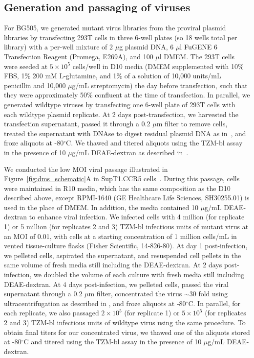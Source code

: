 \documentclass[9pt]{elife}
\begin{document}
\subsection{Generation and passaging of viruses}
For BG505, we generated mutant virus libraries from the proviral plasmid libraries by transfecting 293T cells in three 6-well plates (so 18 wells total per library) with a per-well mixture of 2 $\mu$g plasmid DNA, 6 $\mu$l FuGENE 6 Transfection Reagent (Promega, E269A), and 100 $\mu$l DMEM.
The 293T cells were seeded at $5\times 10^5$ cells/well in D10 media (DMEM supplemented with 10\% FBS, 1\% 200 mM L-glutamine, and 1\% of a solution of 10,000 units/mL penicillin and 10,000 $\mu$g/mL streptomycin) the day before transfection, such that they were approximately 50\% confluent at the time of transfection.
In parallel, we generated wildtype viruses by transfecting one 6-well plate of 293T cells with each wildtype plasmid replicate.
At 2 days post-transfection, we harvested the transfection supernatant, passed it through a 0.2 $\mu$m filter to remove cells, treated the supernatant with DNAse to digest residual plasmid DNA as in~\citet{haddox2016experimental}, and froze aliquots at -80$^{\circ}$C.
We thawed and titered aliquots using the TZM-bl assay in the presence of 10 $\mu$g/mL DEAE-dextran as described in~\citet{dingens2017comprehensive}.

We conducted the low MOI viral passage illustrated in Figure~\ref{fig:dms_schematic}A in SupT1.CCR5 cells~\citep[obtained from Dr. James Hoxie;][]{boyd2015mutations}.
During this passage, cells were maintained in R10 media, which has the same composition as the D10 described above, except RPMI-1640 (GE Healthcare Life Sciences, SH30255.01) is used in the place of DMEM.
In addition, the media contained 10 $\mu$g/mL DEAE-dextran to enhance viral infection.
We infected cells with 4 million (for replicate 1) or 5 million (for replicates 2 and 3) TZM-bl infectious units of mutant virus at an MOI of 0.01, with cells at a starting concentration of 1 million cells/mL in vented tissue-culture flasks (Fisher Scientific, 14-826-80).
At day 1 post-infection, we pelleted cells, aspirated the supernatant, and resuspended cell pellets in the same volume of fresh media still including the DEAE-dextran.
At 2 days post-infection, we doubled the volume of each culture with fresh media still including DEAE-dextran.
At 4 days post-infection, we pelleted cells, passed the viral supernatant through a 0.2 $\mu$m filter, concentrated the virus $\sim$30 fold using ultracentrifugation as described in \citet{dingens2017comprehensive}, and froze aliquots at -80$^{\circ}$C.
In parallel, for each replicate, we also passaged $2\times 10^5$ (for replicate 1) or $5 \times 10^5$ (for replicates 2 and 3) TZM-bl infectious units of wildtype virus using the same procedure.
To obtain final titers for our concentrated virus, we thawed one of the aliquots stored at -80$^{\circ}$C and titered using the TZM-bl assay in the presence of 10 $\mu$g/mL DEAE-dextran.
\end{document}
